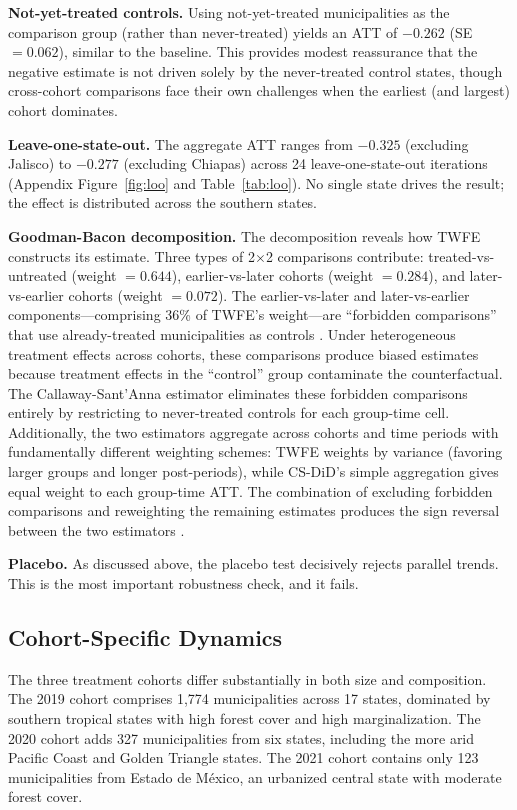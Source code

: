 \documentclass[12pt]{article}
\begin{document}
\textbf{Not-yet-treated controls.} Using not-yet-treated municipalities as the comparison group (rather than never-treated) yields an ATT of $-0.262$ (SE $= 0.062$), similar to the baseline. This provides modest reassurance that the negative estimate is not driven solely by the never-treated control states, though cross-cohort comparisons face their own challenges when the earliest (and largest) cohort dominates.

\textbf{Leave-one-state-out.} The aggregate ATT ranges from $-0.325$ (excluding Jalisco) to $-0.277$ (excluding Chiapas) across 24 leave-one-state-out iterations (Appendix Figure~\ref{fig:loo} and Table~\ref{tab:loo}). No single state drives the result; the effect is distributed across the southern states.

\label{sec:bacon}
\textbf{Goodman-Bacon decomposition.} The decomposition reveals how TWFE constructs its estimate. Three types of 2$\times$2 comparisons contribute: treated-vs-untreated (weight $= 0.644$), earlier-vs-later cohorts (weight $= 0.284$), and later-vs-earlier cohorts (weight $= 0.072$). The earlier-vs-later and later-vs-earlier components---comprising 36\% of TWFE's weight---are ``forbidden comparisons'' that use already-treated municipalities as controls \citep{goodmanbacon2021difference}. Under heterogeneous treatment effects across cohorts, these comparisons produce biased estimates because treatment effects in the ``control'' group contaminate the counterfactual. The Callaway-Sant'Anna estimator eliminates these forbidden comparisons entirely by restricting to never-treated controls for each group-time cell. Additionally, the two estimators aggregate across cohorts and time periods with fundamentally different weighting schemes: TWFE weights by variance (favoring larger groups and longer post-periods), while CS-DiD's simple aggregation gives equal weight to each group-time ATT. The combination of excluding forbidden comparisons and reweighting the remaining estimates produces the sign reversal between the two estimators \citep{callaway2021difference, goodmanbacon2021difference}.

\textbf{Placebo.} As discussed above, the placebo test decisively rejects parallel trends. This is the most important robustness check, and it fails.

\subsection{Cohort-Specific Dynamics}

The three treatment cohorts differ substantially in both size and composition. The 2019 cohort comprises 1,774 municipalities across 17 states, dominated by southern tropical states with high forest cover and high marginalization. The 2020 cohort adds 327 municipalities from six states, including the more arid Pacific Coast and Golden Triangle states. The 2021 cohort contains only 123 municipalities from Estado de M\'{e}xico, an urbanized central state with moderate forest cover.
\end{document}
